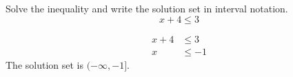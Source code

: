 

Solve the inequality and write the solution set in interval notation.
\[ x+4 \leq 3  \]


\begin{solution}
\[\begin{split}
x+4 &\leq 3\\
x&\leq -1
\end{split}
\]
The solution set is $(-\infty, -1]$.
\end{solution}